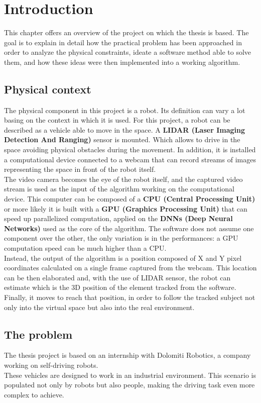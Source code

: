 \chapter{Introduction} \label{cha:introduction}
This chapter offers an overview of the project on which the thesis is based. The goal is to explain in detail how the practical problem has been approached in order to analyze the physical constraints, ideate a software method able to solve them, and how these ideas were then implemented into a working algorithm. 


\section{Physical context}
The physical component in this project is a robot. Its definition can vary a lot basing on the context in which it is used. For this project, a robot can be described as a vehicle able to move in the space. A \textbf{LIDAR (Laser Imaging Detection And Ranging)} sensor is mounted. Which allows to drive in the space avoiding physical obstacles during the movement. In addition, it is installed a computational device connected to a webcam that can record streams of images representing the space in front of the robot itself.\\
The video camera becomes the eye of the robot itself, and the captured video stream is used as the input of the algorithm working on the computational device. This computer can be composed of a \textbf{CPU (Central Processing Unit)} or more likely it is built with a \textbf{GPU (Graphics Processing Unit)} that can speed up parallelized computation, applied on the \textbf{DNNs (Deep Neural Networks)} used as the core of the algorithm. The software does not assume one component over the other, the only variation is in the performances: a GPU computation speed can be much higher than a CPU.\\
Instead, the output of the algorithm is a position composed of X and Y pixel coordinates calculated on a single frame captured from the webcam. This location can be then elaborated and, with the use of LIDAR sensor, the robot can estimate which is the 3D position of the element tracked from the software.\\
Finally, it moves to reach that position, in order to follow the tracked subject not only into the virtual space but also into the real environment.


\section{The problem}
The thesis project\cite{projectSourceCode} is based on an internship with Dolomiti Robotics\cite{dolomitiRobotics}, a company working on self-driving robots.\\
These vehicles are designed to work in an industrial environment. This scenario is populated not only by robots but also people, making the driving task even more complex to achieve.


